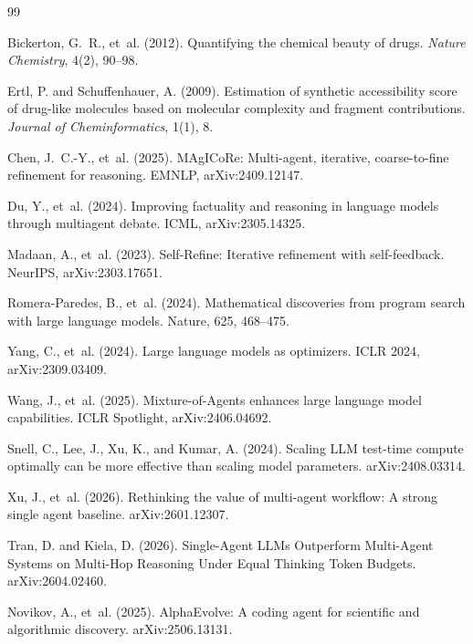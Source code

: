 \documentclass{article}
\begin{document}
\begin{thebibliography}{99}

Bickerton, G.~R., et~al. (2012).
Quantifying the chemical beauty of drugs.
\emph{Nature Chemistry}, 4(2), 90--98.

Ertl, P. and Schuffenhauer, A. (2009).
Estimation of synthetic accessibility score of drug-like molecules based on molecular complexity and fragment contributions.
\emph{Journal of Cheminformatics}, 1(1), 8.

Chen, J.~C.-Y., et~al. (2025).
MAgICoRe: Multi-agent, iterative, coarse-to-fine refinement for reasoning.
EMNLP, arXiv:2409.12147.

Du, Y., et~al. (2024).
Improving factuality and reasoning in language models through multiagent debate.
ICML, arXiv:2305.14325.

Madaan, A., et~al. (2023).
Self-Refine: Iterative refinement with self-feedback.
NeurIPS, arXiv:2303.17651.

Romera-Paredes, B., et~al. (2024).
Mathematical discoveries from program search with large language models.
Nature, 625, 468--475.

Yang, C., et~al. (2024).
Large language models as optimizers.
ICLR 2024, arXiv:2309.03409.

Wang, J., et~al. (2025).
Mixture-of-Agents enhances large language model capabilities.
ICLR Spotlight, arXiv:2406.04692.

Snell, C., Lee, J., Xu, K., and Kumar, A. (2024).
Scaling LLM test-time compute optimally can be more effective than scaling model parameters.
arXiv:2408.03314.

Xu, J., et~al. (2026).
Rethinking the value of multi-agent workflow: A strong single agent baseline.
arXiv:2601.12307.

Tran, D. and Kiela, D. (2026).
Single-Agent LLMs Outperform Multi-Agent Systems on Multi-Hop Reasoning Under Equal Thinking Token Budgets.
arXiv:2604.02460.

Novikov, A., et~al. (2025).
AlphaEvolve: A coding agent for scientific and algorithmic discovery.
arXiv:2506.13131.


\end{thebibliography}
\end{document}
